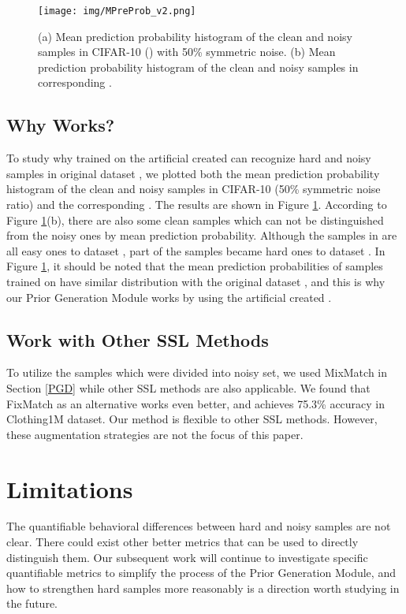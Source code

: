 \documentclass[letterpaper]{article} \usepackage{aaai22}  \usepackage{times}  \usepackage{helvet}  \usepackage{courier}  \usepackage[hyphens]{url}  \usepackage{graphicx} \urlstyle{rm} \def\UrlFont{\rm}  \usepackage{natbib}  \usepackage{caption} \DeclareCaptionStyle{ruled}{labelfont=normalfont,labelsep=colon,strut=off} \frenchspacing  \setlength{\pdfpagewidth}{8.5in}  \setlength{\pdfpageheight}{11in}  \usepackage{algorithm}
\begin{document}
\begin{figure}[]
  \centering
  \texttt{[image: img/MPreProb\_v2.png]}
  \vskip -0.1in
\caption{{(a) Mean prediction probability histogram of the clean and noisy samples in CIFAR-10 () with 50\% symmetric noise. (b) Mean prediction probability histogram of the clean and noisy samples in corresponding .}}
  \vskip -0.15in
  \label{fig:clean_noise}
\end{figure}

\subsection{Why  Works?}
{To study why  trained on the artificial created  can recognize hard and noisy samples in original dataset , we plotted both the mean prediction probability histogram of the clean and noisy samples in CIFAR-10 (50\% symmetric noise ratio)  and the corresponding . The results are shown in Figure \ref{fig:clean_noise}. According to Figure \ref{fig:clean_noise}(b), there are also some clean samples which can not be distinguished from the noisy ones by mean prediction probability. Although the samples in  are all easy ones to dataset , part of the samples became hard ones to dataset . In Figure \ref{fig:clean_noise}, it should be noted that the mean prediction probabilities of samples trained on  have similar distribution with the original dataset , and this is why our Prior Generation Module works by using the artificial created .}


\subsection{Work with Other SSL Methods}
{To utilize the samples which were divided into noisy set, we used MixMatch \cite{2019MixMatch} in Section \ref{PGD} while other SSL methods are also applicable. We found that FixMatch \cite{sohn2020fixmatch} as an alternative works even better, and achieves 75.3\% accuracy in Clothing1M dataset. Our method is flexible to other SSL methods. However, these augmentation strategies are not the focus of this paper.}

\section{Limitations}
\label{Limitations}
The quantifiable behavioral differences between hard and noisy samples are not clear. There could exist other better metrics that can be used to directly distinguish them. Our subsequent work will continue to investigate specific quantifiable metrics to simplify the process of the Prior Generation Module, and how to strengthen hard samples more reasonably is a direction worth studying in the future.
\end{document}
